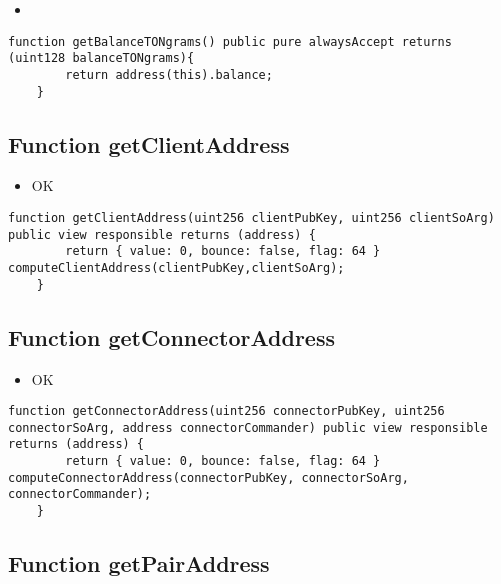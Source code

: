 \begin{itemize}
\item {}
\end{itemize}

\begin{lstlisting}[firstnumber=334]
	function getBalanceTONgrams() public pure alwaysAccept returns (uint128 balanceTONgrams){
		return address(this).balance;
	}
\end{lstlisting}

\subsection{Function getClientAddress}

\begin{itemize}
\item OK
\end{itemize}

\begin{lstlisting}[firstnumber=118]
	function getClientAddress(uint256 clientPubKey, uint256 clientSoArg) public view responsible returns (address) {
		return { value: 0, bounce: false, flag: 64 } computeClientAddress(clientPubKey,clientSoArg);
	}
\end{lstlisting}

\subsection{Function getConnectorAddress}

\begin{itemize}
\item OK
\end{itemize}

\begin{lstlisting}[firstnumber=233]
	function getConnectorAddress(uint256 connectorPubKey, uint256 connectorSoArg, address connectorCommander) public view responsible returns (address) {
		return { value: 0, bounce: false, flag: 64 } computeConnectorAddress(connectorPubKey, connectorSoArg, connectorCommander);
	}
\end{lstlisting}

\subsection{Function getPairAddress}


